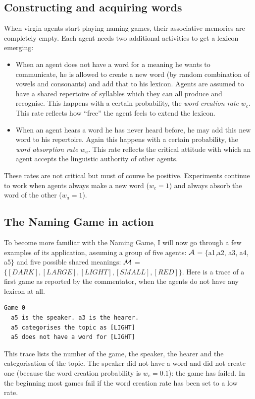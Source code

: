 \subsection{Constructing and acquiring words}

When virgin agents start playing naming games, their 
associative memories are completely empty. Each agent 
needs two additional activities to get a lexicon
emerging: 
\begin{itemize}
\item 
When an agent does not have a word for a
meaning he wants to communicate, he is allowed to create
a new word (by random combination of vowels and 
consonants) and add that to his 
lexicon. Agents are assumed to have a 
shared repertoire of syllables which they can all 
produce and recognise. This happens with a certain 
probability, the {\itshape word creation rate} $w_{c}$. 
This rate reflects how ``free'' the agent feels to 
extend the lexicon. 
\item 
When an agent hears a word he has 
never heard before, he may add this new word to his 
repertoire. Again this happens with a certain
probability, the {\itshape word absorption rate} $w_{a}$. 
This rate reflects the critical attitude with which an 
agent accepts the linguistic authority of other agents. 
\end{itemize}
These rates are not critical but must of course
be positive. Experiments continue to work 
when agents always make a new word ($w_{c}=1$) 
and always absorb the word of the other ($w_{a}=1$). 

\subsection{The Naming Game in action}
 
To become more familiar with the Naming Game, I will now 
go through a few examples of its application, assuming 
a group of five agents: ${\cal A}$ = $\{${\bfshape a1},{\bfshape a2},
{\bfshape a3}, {\bfshape a4}, {\bfshape a5}$\}$ and five possible shared meanings: 
\newline 
${\cal M}$ = $\{[DARK],[LARGE],[LIGHT],[SMALL],[RED]\}$. 
\newline
Here is a trace of a first game as reported by 
the commentator, when the agents do not have any lexicon at
all. 
\begin{verbatim}
Game 0 
  a5 is the speaker. a3 is the hearer. 
  a5 categorises the topic as [LIGHT]
  a5 does not have a word for [LIGHT]
\end{verbatim}
This trace lists the number of the game, the speaker, the 
hearer and the categorisation of
the topic. The speaker did not have a word and did not 
create one (because the word creation probability is 
$w_{c}=0.1$): the game has failed. In the beginning 
most games fail if the word creation rate has been set to a low rate.

